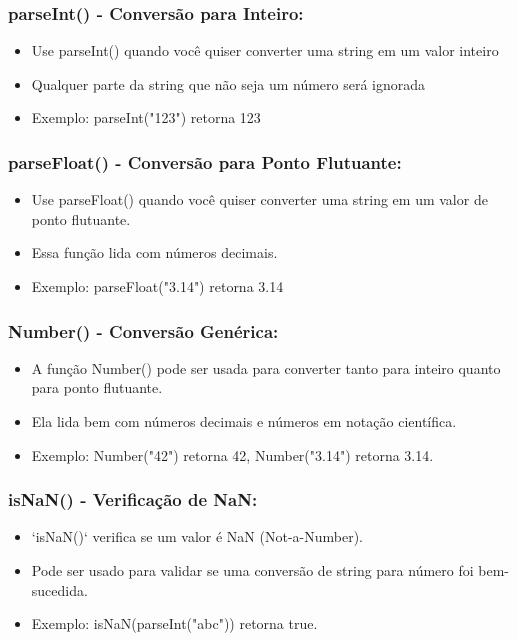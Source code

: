 \documentclass[13pt, xcolor={dvipsnames,svgnames}, portuguese]{beamer}
\begin{document}
\begin{frame}
\frametitle{parseInt() - Conversão para Inteiro:}
\begin{itemize}
  \item Use parseInt() quando você quiser converter uma string em um valor inteiro
  \item Qualquer parte da string que não seja um número será ignorada
  \item Exemplo: parseInt("123") retorna 123
\end{itemize}
\end{frame}

\begin{frame}
\frametitle{parseFloat() - Conversão para Ponto Flutuante:}
\begin{itemize}
  \item Use parseFloat() quando você quiser converter uma string em um valor de ponto flutuante.
  \item Essa função lida com números decimais.
  \item Exemplo: parseFloat("3.14") retorna 3.14
\end{itemize}
\end{frame}

\begin{frame}
\frametitle{Number() - Conversão Genérica:}

\begin{itemize}
  \item A função Number() pode ser usada para converter tanto para inteiro quanto para ponto flutuante.
  \item Ela lida bem com números decimais e números em notação científica.
  \item Exemplo: Number("42") retorna 42, Number("3.14") retorna 3.14.
\end{itemize}
\end{frame}


\begin{frame}
\frametitle{isNaN() - Verificação de NaN:}

\begin{itemize}
  \item `isNaN()` verifica se um valor é NaN (Not-a-Number).
  \item Pode ser usado para validar se uma conversão de string para número foi bem-sucedida.
  \item Exemplo: isNaN(parseInt("abc")) retorna true.
\end{itemize}
\end{frame}
\end{document}
